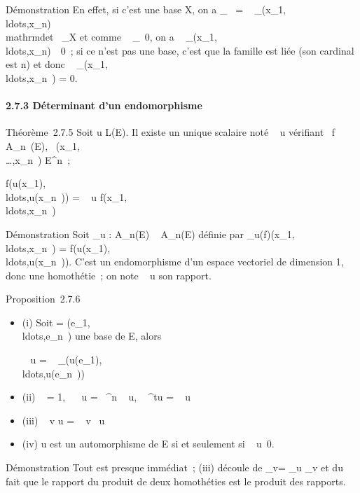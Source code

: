 \documentclass[]{article}
\begin{document}
Démonstration En effet, si c'est une base X, on a
 \_~
= ~
\_(x\_1,\\ldots,x\_n)\\mathrm{det}~
\_X et comme
~
\_\neq~0, on a
~
\_(x\_1,\\ldots,x\_n)\mathrel\neq~~0~;
si ce n'est pas une base, c'est que la famille est liée (son cardinal
est n) et donc ~
\_(x\_1,\\ldots,x\_n~)
= 0.

\paragraph{2.7.3 Déterminant d'un endomorphisme}

Théorème~2.7.5 Soit u \in L(E). Il existe un unique scalaire noté
~ u vérifiant
\forall~f \in A\_n~(E),
\forall~(x\_1,\\\ldots,x\_n~)
\in E^n~;

f(u(x\_1),\\ldots,u(x\_n~))
= ~ u
f(x\_1,\\ldots,x\_n~)

Démonstration Soit \phi\_u : A\_n(E) \rightarrow~ A\_n(E)
définie par
\phi\_u(f)(x\_1,\\ldots,x\_n~)
=
f(u(x\_1),\\ldots,u(x\_n~)).
C'est un endomorphisme d'un espace vectoriel de dimension 1, donc une
homothétie~; on note
~ u son rapport.

Proposition~2.7.6

\begin{itemize}
\item
  (i) Soit  =
  (e\_1,\\ldots,e\_n~)
  une base de E, alors

  ~ u
  = ~
  \_(u(e\_1),\\ldots,u(e\_n~))
\item
  (ii) ~
  \mathrmId = 1,
  ~ \lambda~u =
  \lambda~^n ~
  u, ~
  ^tu = ~
  u
\item
  (iii) ~ v \cdot u
  = ~
  v~ u
\item
  (iv) u est un automorphisme de E si et seulement si
  ~
  u\neq~0.
\end{itemize}

Démonstration Tout est presque immédiat~; (iii) découle de
\phi\_v\cdotu = \phi\_u \cdot \phi\_v et du fait que le rapport
du produit de deux homothéties est le produit des rapports.
\end{document}

